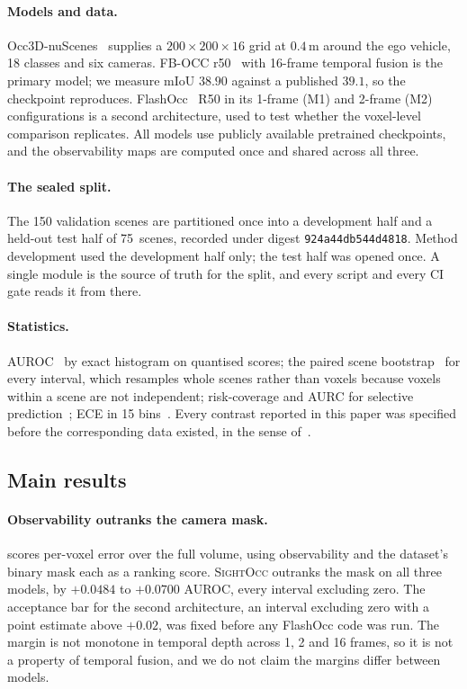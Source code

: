 \documentclass[10pt,twocolumn,letterpaper]{article}
\newcommand{\nScenes}{75}
\newcommand{\splitdigest}{\texttt{924a44db544d4818}}
\begin{document}
\paragraph{Models and data.}
Occ3D-nuScenes~\cite{tian2023occ3d, caesar2020nuscenes} supplies a
$200\times200\times16$ grid at $0.4$\,m around the ego vehicle, 18 classes
and six cameras. FB-OCC r50~\cite{li2023fbocc} with 16-frame temporal
fusion is the primary model; we measure mIoU $38.90$ against a published
$39.1$, so the checkpoint reproduces. FlashOcc~\cite{yu2023flashocc} R50 in
its 1-frame (M1) and 2-frame (M2) configurations is a second architecture,
used to test whether the voxel-level comparison replicates. All models use
publicly available pretrained checkpoints, and the observability maps are
computed once and shared across all three.

\paragraph{The sealed split.}
The 150 validation scenes are partitioned once into a development half and
a held-out test half of \nScenes\ scenes, recorded under digest
\splitdigest. Method development used the development half only; the test
half was opened once. A single module is the source of truth for the
split, and every script and every CI gate reads it from there.

\paragraph{Statistics.}
AUROC~\cite{hanley1982roc} by exact histogram on quantised scores; the
paired scene bootstrap~\cite{efron1986bootstrap} for every interval, which
resamples whole scenes rather than voxels because voxels within a scene are
not independent; risk-coverage and AURC for selective
prediction~\cite{elyaniv2010selective, geifman2017selective}; ECE in 15
bins~\cite{naeini2015ece}. Every contrast reported in this paper was
specified before the corresponding data existed, in the sense
of~\cite{nosek2018preregistration}.

\subsection{Main results}
\label{sec:main}

\paragraph{Observability outranks the camera mask.}
\label{sec:h2}
 scores per-voxel error over the full volume, using
observability and the dataset's binary mask each as a ranking score.
\textsc{SightOcc} outranks the mask on all three models, by $+0.0484$ to
$+0.0700$ AUROC, every interval excluding zero. The acceptance bar for the
second architecture, an interval excluding zero with a point estimate above
$+0.02$, was fixed before any FlashOcc code was run. The margin is not
monotone in temporal depth across 1, 2 and 16 frames, so it is not a
property of temporal fusion, and we do not claim the margins differ between
models.
\end{document}
